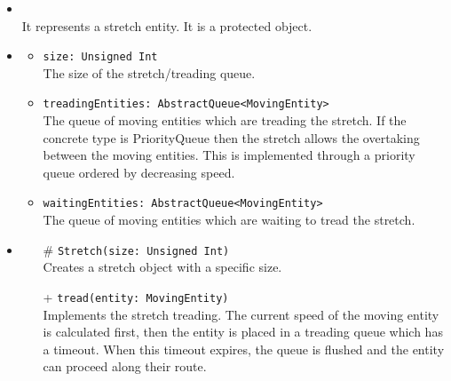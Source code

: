 \begin{itemize}
  \item \textbf{\descr} \\
    It represents a stretch entity. It is a protected object.
  \item \textbf{\attrs}
  \begin{itemize}
    \item \texttt{size: Unsigned Int} \\
The size of the stretch/treading queue.
    \item \texttt{treadingEntities: AbstractQueue<MovingEntity>} \\
The queue of moving entities which are treading the stretch. If the concrete type
is PriorityQueue then the stretch allows the overtaking between the moving entities.
This is implemented through a priority queue ordered by decreasing speed.
    \item \texttt{waitingEntities: AbstractQueue<MovingEntity>} \\
The queue of moving entities which are waiting to tread the stretch. 
  \end{itemize}
  \item \textbf{\ops}
  \begin{itemize}
    \item[\#] \texttt{Stretch(size: Unsigned Int)} \\
Creates a stretch object with a specific size.
    \item[+] \texttt{tread(entity: MovingEntity)} \\
Implements the stretch treading. The current speed of the moving entity
is calculated first, then the entity is placed in a treading queue which has a  
timeout. When this timeout expires, the queue is flushed and the entity can
proceed along their route.
  \end{itemize}
\end{itemize}
